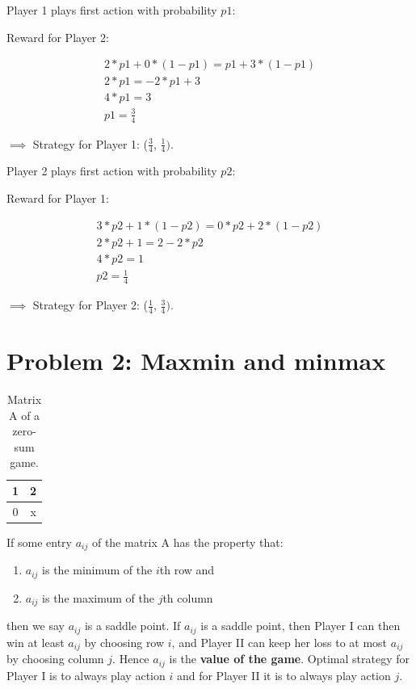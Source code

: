 \documentclass[12pt, titlepage]{article}
\begin{document}
Player 1 plays first action with probability $p1$:

Reward for Player 2:

\begin{gather*} 
2*p1 + 0*(1-p1) = p1 + 3*(1-p1) \\
2*p1 = -2*p1 + 3 \\
4*p1 = 3 \\
p1 = \frac{3}{4}
\end{gather*}

$\implies$ Strategy for Player 1: ($\frac{3}{4}$, $\frac{1}{4})$.

\vskip1cm

Player 2 plays first action with probability $p2$:

Reward for Player 1:

\begin{gather*} 
3*p2 + 1*(1-p2) = 0*p2 + 2*(1-p2) \\
2*p2 + 1 = 2 - 2*p2 \\
4*p2 = 1 \\
p2 = \frac{1}{4}
\end{gather*}

$\implies$ Strategy for Player 2: ($\frac{1}{4}$, $\frac{3}{4})$.


\section{Problem 2: Maxmin and minmax}
\begin {table}[H]
\begin{center}
\begin{tabular}[c]{|c|c|}
\hline 
1 & 2 \\ 
\hline 
0 & x \\ 
\hline 
\end{tabular} 
\end{center}
\caption{Matrix A of a zero-sum game.}
\end {table}

If some entry $a_{ij}$ of the matrix A has the property that:

\begin{enumerate}
\item $a_{ij}$ is the minimum of the $i$th row and
\item $a_{ij}$ is the maximum of the $j$th column
\end{enumerate}

then we say $a_{ij}$ is a saddle point. If $a_{ij}$ is a saddle point, then Player I can then win at
least $a_{ij}$ by choosing row $i$, and Player II can keep her loss to at most $a_{ij}$ by choosing
column $j$. Hence $a_{ij}$ is the \textbf{value of the game}. Optimal strategy for Player I is to always play action $i$ and for Player II it is to always play action $j$. 
\end{document}
